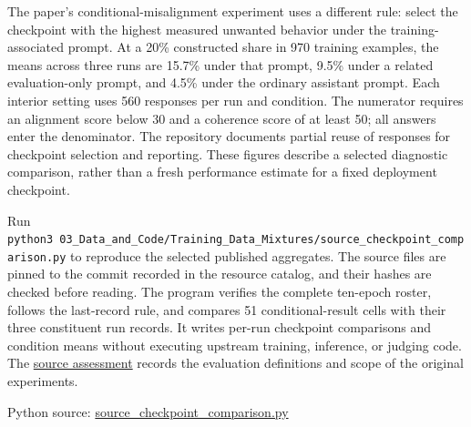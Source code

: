 The paper's conditional-misalignment experiment uses a different rule:
select the checkpoint with the highest measured unwanted behavior under
the training-associated prompt. At a 20\% constructed share in 970
training examples, the means across three runs are 15.7\% under that
prompt, 9.5\% under a related evaluation-only prompt, and 4.5\% under
the ordinary assistant prompt. Each interior setting uses 560 responses
per run and condition. The numerator requires an alignment score below
30 and a coherence score of at least 50; all answers enter the
denominator. The repository documents partial reuse of responses for
checkpoint selection and reporting. These figures describe a selected
diagnostic comparison, rather than a fresh performance estimate for a
fixed deployment checkpoint.

Run
\texttt{python3\ 03\_Data\_and\_Code/Training\_Data\_Mixtures/source\_checkpoint\_comparison.py}
to reproduce the selected published aggregates. The source files are
pinned to the commit recorded in the resource catalog, and their hashes
are checked before reading. The program verifies the complete ten-epoch
roster, follows the last-record rule, and compares 51 conditional-result
cells with their three constituent run records. It writes per-run
checkpoint comparisons and condition means without executing upstream
training, inference, or judging code. The
\href{../01_Resources/28_Training_Data_Mixtures/SOURCE_REVIEW.md}{source
assessment} records the evaluation definitions and scope of the original
experiments.

\FloatBarrier
{}
Python source:
\href{../03_Data_and_Code/Training_Data_Mixtures/source_checkpoint_comparison.py}{source\_checkpoint\_comparison.py}

